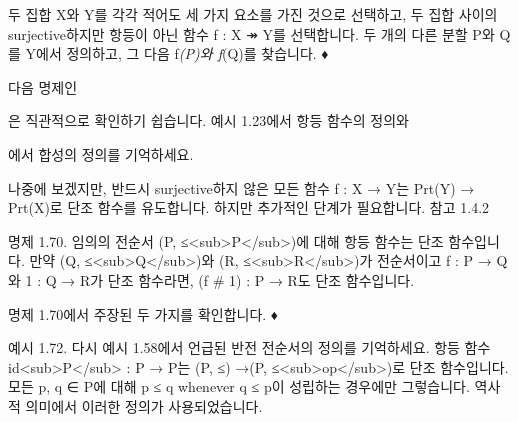 \documentclass[11pt, a4paper, twoside, openany]{book}
\begin{document}
\par\medskip
\begin{exercisebox}[연습문제 1.69.]
두 집합 X\hspace{0pt}와 Y\hspace{0pt}를 각각 적어도 세 가지 요소를 가진 것으로 선택하고, 두 집합 사이의 surjective\hspace{0pt}하지만 항등이 아닌 함수 f : X ↠ Y\hspace{0pt}를 선택합니다. 두 개의 다른 분할 P\hspace{0pt}와 Q\hspace{0pt}를 Y\hspace{0pt}에서 정의하고, 그 다음 f\textit{(P)와 f}(Q)를 찾습니다.
♦
\end{exercisebox}

\par\medskip
다음 명제인 
\begin{definitionbox}[Proposition 1.70]
\hspace{0pt}은 직관적으로 확인하기 쉽습니다. 예시 1.23\hspace{0pt}에서 항등 함수의 정의와 
\begin{definitionbox}[정의 1.28]
\hspace{0pt}에서 합성의 정의를 기억하세요.
\end{definitionbox}
\end{definitionbox}

\par{} 나중에 보겠지만, 반드시 surjective\hspace{0pt}하지 않은 모든 함수 f : X → Y\hspace{0pt}는 Prt(Y) → Prt(X)로 단조 함수를 유도합니다. 하지만 추가적인 단계가 필요합니다. 참고 1.4.2

\par\medskip
명제 1.70. 임의의 전순서 (P, ≤<sub>P</sub>)에 대해 항등 함수는 단조 함수입니다. 만약 (Q, ≤<sub>Q</sub>)와 (R, ≤<sub>R</sub>)가 전순서이고 f : P → Q\hspace{0pt}와 1 : Q → R\hspace{0pt}가 단조 함수라면, (f \# 1) : P → R\hspace{0pt}도 단조 함수입니다.

\par\medskip
\begin{exercisebox}[연습문제 1.71.]
명제 1.70\hspace{0pt}에서 주장된 두 가지를 확인합니다.
♦
\end{exercisebox}

\par\medskip
예시 1.72. 다시 예시 1.58\hspace{0pt}에서 언급된 반전 전순서의 정의를 기억하세요. 항등 함수 id<sub>P</sub> : P → P\hspace{0pt}는 (P, ≤) →(P, ≤<sub>op</sub>)로 단조 함수입니다. 모든 p, q ∈ P\hspace{0pt}에 대해 p ≤ q whenever q ≤ p\hspace{0pt}이 성립하는 경우에만 그렇습니다. 역사적 의미에서 이러한 정의가 사용되었습니다.
\end{document}
